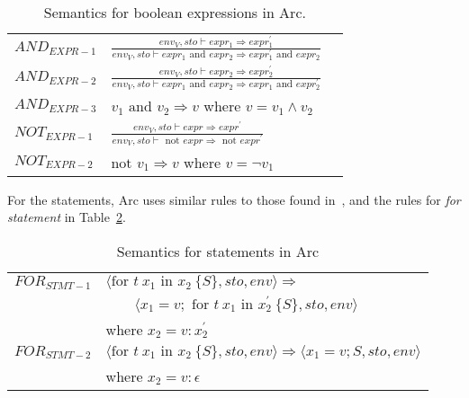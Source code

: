 \begin{table}[htb!]
    \centering
    \begin{tabular}{lll}
        \toprule
        $AND_{EXPR-1}$ & $\frac
            {env_V, sto \vdash expr_1 \Rightarrow expr^\prime_1}
            {env_V, sto \vdash expr_1 \text{ and } expr_2 \Rightarrow expr^\prime_1 \text{ and } expr_2}$ \\ [12pt]
        $AND_{EXPR-2}$ & $\frac
            {env_V, sto \vdash expr_2 \Rightarrow expr^\prime_2}
            {env_V, sto \vdash expr_1 \text{ and } expr_2 \Rightarrow expr_1 \text{ and } expr^\prime_2}$ \\ [12pt]
        $AND_{EXPR-3}$ & $v_1 \text{ and } v_2 \Rightarrow v$ where $ v = v_1 \land v_2$                  \\ [12pt]
        $NOT_{EXPR-1}$ & $\frac
            {env_V, sto \vdash expr \Rightarrow expr^\prime}
            {env_V, sto \vdash \text{ not } expr \Rightarrow \text{ not } expr^\prime}$                   \\ [12pt]
        $NOT_{EXPR-2}$ & $\text{not } v_1 \Rightarrow v$ where $v = \neg v_1 $                            \\
        \bottomrule
    \end{tabular}
    \caption{Semantics for boolean expressions in Arc.}
    \label{tab:booleansemantics}
\end{table}


For the statements, Arc uses similar rules to those found in~\cite[Ch.~10]{Huttel2010}, and the rules for \textit{for statement} in Table~\ref{tab:statementsemantics}.


\begin{table}[htbp]
    \centering
    \begin{tabular}{ll}
        $FOR_{STMT-1}$ & $\langle \text{for } t \ x_1 \text{ in } x_2 \ \{ S \}, sto, env \rangle \Rightarrow$                                      \\
                       & $\qquad \langle x_1 = v; \text{ for } t \ x_1 \text{ in } x^\prime_2 \ \{ S \}, sto, env \rangle$                          \\
                       & where $x_2 = v : x^\prime_2$                                                                                               \\[12pt]
        $FOR_{STMT-2}$ & $\langle \text{for } t \ x_1 \text{ in } x_2 \ \{ S \}, sto, env \rangle \Rightarrow \langle x_1 = v; S, sto, env \rangle$ \\
                       & where $x_2 = v : \epsilon$
    \end{tabular}
    \caption{Semantics for statements in Arc}
    \label{tab:statementsemantics}
\end{table}

